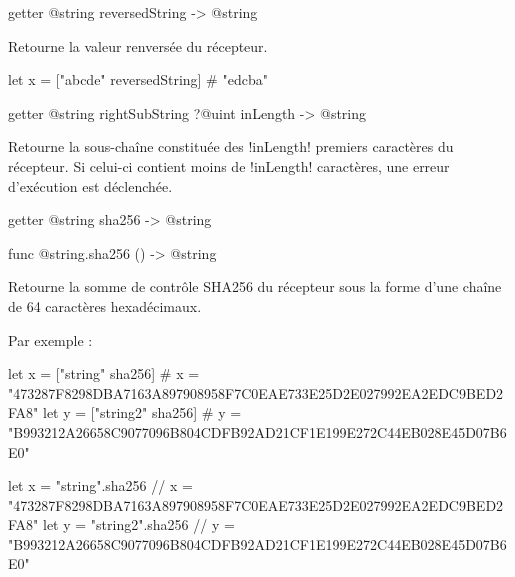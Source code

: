 \begin{galgas3box}
getter @string reversedString -> @string
\end{galgas3box}

Retourne la valeur renversée du récepteur.

\begin{galgas3}
let x = ["abcde" reversedString] # "edcba"
\end{galgas3}









\begin{galgas3box}
getter @string rightSubString ?@uint inLength -> @string
\end{galgas3box}

Retourne la sous-chaîne constituée des \ggst!inLength! premiers caractères du récepteur. Si celui-ci contient moins de \ggst!inLength! caractères, une erreur d'exécution est déclenchée.




\begin{galgas3box}
getter @string sha256 -> @string
\end{galgas3box}

\begin{galgas4box}
func @string.sha256 () -> @string
\end{galgas4box}

Retourne la somme de contrôle SHA256 du récepteur sous la forme d'une chaîne de 64 caractères hexadécimaux.

Par exemple :
\begin{galgas3}
  let x = ["string"  sha256]
    # x = "473287F8298DBA7163A897908958F7C0EAE733E25D2E027992EA2EDC9BED2FA8"
  let y = ["string2" sha256]
    # y = "B993212A26658C9077096B804CDFB92AD21CF1E199E272C44EB028E45D07B6E0"
\end{galgas3}

\begin{galgas4}
  let x = "string".sha256
   // x = "473287F8298DBA7163A897908958F7C0EAE733E25D2E027992EA2EDC9BED2FA8"
  let y = "string2".sha256
   // y = "B993212A26658C9077096B804CDFB92AD21CF1E199E272C44EB028E45D07B6E0"
\end{galgas4}









